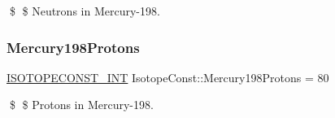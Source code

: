 \$ \$ Neutrons in Mercury-\/198. \mbox{\label{group___isotope_const-_mercury-_hg198_ga190293b22c605f8b932d528d9ba2a218}} 
\subsubsection{\texorpdfstring{Mercury198\+Protons}{Mercury198Protons}}
{\footnotesize\ttfamily \mbox{\hyperlink{group___isotope_const-_macros_ga5f18360b3e99483a35c32d789e62621c}{I\+S\+O\+T\+O\+P\+E\+C\+O\+N\+S\+T\+\_\+\+I\+NT}} Isotope\+Const\+::\+Mercury198\+Protons = 80}

\$ \$ Protons in Mercury-\/198. 